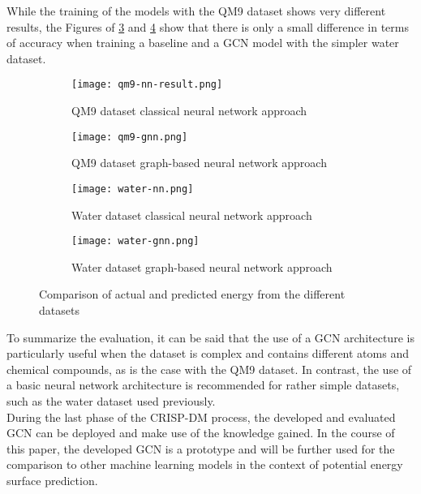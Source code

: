 While the training of the models with the QM9 dataset shows very different results, the Figures of \ref{fig:sfig3} and \ref{fig:sfig4} show that there is only a small difference in terms of accuracy when training a baseline and a GCN model with the simpler water dataset.


\begin{figure}[h!]
    \begin{subfigure}{.5\textwidth}
     \captionsetup{justification=centering}
      \centering
      \texttt{[image: qm9-nn-result.png]}
      \caption{QM9 dataset classical neural network approach}
      \label{fig:sfig1}
    \end{subfigure}%
    \begin{subfigure}{.5\textwidth}
      \centering
      \captionsetup{justification=centering}
      \texttt{[image: qm9-gnn.png]}
      \caption{QM9 dataset graph-based neural network approach}
      \label{fig:sfig2}
    \end{subfigure}
    \begin{subfigure}{.5\textwidth}
        \centering
        \captionsetup{justification=centering}
        \texttt{[image: water-nn.png]}
        \caption{Water dataset classical neural network approach}
        \label{fig:sfig3}
      \end{subfigure}
      \begin{subfigure}{.5\textwidth}
        \captionsetup{justification=centering}
        \centering
        \texttt{[image: water-gnn.png]}
        \caption{Water dataset graph-based neural network approach}
        \label{fig:sfig4}
      \end{subfigure}
    \caption{Comparison of actual and predicted energy from the different datasets}
    \label{fig:plotsofresults}
    \end{figure}

To summarize the evaluation, it can be said that the use of a GCN architecture is particularly useful when the dataset is complex and contains different atoms and chemical compounds, as is the case with the QM9 dataset. In contrast, the use of a basic neural network architecture is recommended for rather simple datasets, such as the water dataset used previously. \\

During the last phase of the CRISP-DM process, the developed and evaluated GCN can be deployed and make use of the knowledge gained. In the course of this paper, the developed GCN is a prototype and will be further used for the comparison to other machine learning models in the context of potential energy surface prediction. 


